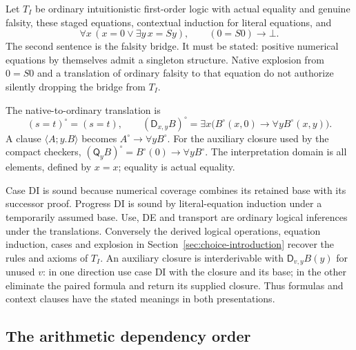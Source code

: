\documentclass[11pt,a4paper]{article}
\theoremstyle{definition}\newtheorem{definition}[theorem]{Definition}
\begin{document}
Let $T_I$ be ordinary intuitionistic first-order logic with actual
equality and genuine falsity, these staged equations, contextual
induction for literal equations, and
\[
\forall x\,(x=0\vee\exists y\,x=Sy),
\qquad (0=S0)\to\bot.
\]
The second sentence is the falsity bridge. It must be stated: positive
numerical equations by themselves admit a singleton structure. Native
explosion from $0=S0$ and a translation of ordinary falsity to that
equation do not authorize silently dropping the bridge from $T_I$.

The native-to-ordinary translation is
\[
(s=t)^\circ=(s=t),\qquad
(\mathsf D_{x,y}B)^\circ=
\exists x\bigl(B^\circ(x,0)\to\forall y B^\circ(x,y)\bigr).
\]
A clause $\langle A;y.B\rangle$ becomes $A^\circ\to\forall yB^\circ$.
For the auxiliary closure used by the compact checkers,
$(\mathsf Q_yB)^\circ=B^\circ(0)\to\forall yB^\circ$.
The interpretation domain is all elements, defined by $x=x$;
equality is actual equality.

Case DI is sound because numerical coverage combines its retained base
with its successor proof. Progress DI is sound by literal-equation
induction under a temporarily assumed base. Use, DE and transport are
ordinary logical inferences under the translations. Conversely the
derived logical operations, equation induction, cases and explosion in
Section~\ref{sec:choice-introduction} recover the rules and axioms of
$T_I$. An auxiliary closure is interderivable with
$\mathsf D_{v,y}B(y)$ for unused $v$: in one direction use case DI with
the closure and its base; in the other eliminate the paired formula
and return its supplied closure. Thus formulas and context clauses have
the stated meanings in both presentations.

\subsection{The arithmetic dependency order}
\end{document}
